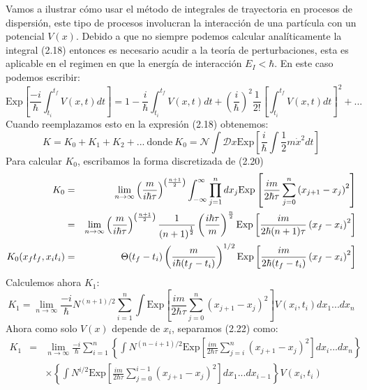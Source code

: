 Vamos a ilustrar cómo usar el método de integrales de trayectoria en procesos de dispersión, este tipo de procesos involucran la interacción de una partícula con un potencial $V(x)$. Debido a que no siempre podemos calcular analíticamente la integral (2.18) entonces es necesario acudir a la teoría de perturbaciones, esta es aplicable en el regimen en que la energía de interacción $E_I<\hbar$. En este caso podemos escribir:
\begin{equation}
\text{Exp}\left[\frac{-i}{\hbar}\int_{t_{i}}^{t_{f}}V(x,t)dt\right]=1-\frac{i}{\hbar}\int_{t_{i}}^{t_{f}}V(x,t)dt+\left(\frac{i}{\hbar}\right)^{2}\frac{1}{2!}\left[\int_{t_{i}}^{t_{f}}V(x,t)dt\right]^{2}+...
\end{equation}
Cuando reemplazamos esto en la expresión (2.18) obtenemos:
\begin{equation}
K=K_0+K_1+K_2+...\ \text{donde}\ K_0=\mathcal{N}\int \mathcal{D}x \text{Exp}\left[ \frac{i}{\hbar}\int \frac{1}{2}m\dot{x}^2dt\right] 
\end{equation}
Para calcular $K_0$, escribamos la forma discretizada de (2.20)
\begin{eqnarray}
\nonumber K_0&=&\lim_{n\to\infty}\left(\frac{m}{i\hbar\tau}\right)^{\left(\frac{n+1}{2}\right)}\int_{-\infty}^{\text{\ensuremath{\infty}}}\prod_{j=1}^{n}dx_{j}\text{Exp}\left[\frac{im}{2\hbar\tau}\sum_{j=0}^{n}\left(x_{j+1}-x_{j}\right)^{2}\right]\\
\nonumber &=& \lim_{n\to\infty}\left(\frac{m}{i\hbar\tau}\right)^{\left(\frac{n+1}{2}\right)}\frac{1}{\left(n+1\right)^{\frac{1}{2}}}\left(\frac{i\hbar\tau}{m}\right)^{\frac{n}{2}}\text{Exp}\left[\frac{im}{2\hbar(n+1)\tau}\left(x_{f}-x_{i}\right)^{2}\right]\\
K_0(x_ft_f,x_it_i)&=& \Theta(t_{f}-t_{i})\left(\frac{m}{i\hbar(t_{f}-t_{i})}\right)^{1/2}\text{Exp}\left[\frac{im}{2\hbar(t_{f}-t_{i})}\left(x_{f}-x_{i}\right)^{2}\right] 
\end{eqnarray}
Calculemos ahora $K_1$:
\begin{equation}
K_1=\lim_{n\to\infty}\frac{-i}{\hbar}N^{(n+1)/2}\sum_{i=1}^{n}\int\text{Exp}\left[\frac{im}{2\hbar\tau}\sum_{j=0}^{n}(x_{j+1}-x_{j})^{2}\right]V(x_{i},t_{i})dx_{1}...dx_{n}
\end{equation}
Ahora como solo $V(x)$ depende de $x_i$, separamos (2.22) como:
\begin{eqnarray}
\nonumber K_1&=&\lim_{n\to\infty}\frac{-i}{\hbar}\sum_{i=1}^{n}\left\{ \int N^{(n-i+1)/2}\text{Exp}\left[\frac{im}{2\hbar\tau}\sum_{j=i}^{n}(x_{j+1}-x_{j})^{2}\right]dx_{i}...dx_{n}\right\}\\
& &\times  \left\{ \int N^{i/2}\text{Exp}\left[\frac{im}{2\hbar\tau}\sum_{j=0}^{i-1}(x_{j+1}-x_{j})^{2}\right]dx_{1}...dx_{i-1}\right\} V(x_{i},t_{i})
\end{eqnarray}
